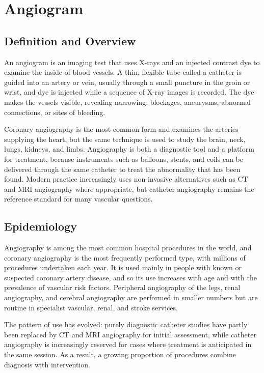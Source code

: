 \chapter{Angiogram}

\section*{Definition and Overview}
An angiogram is an imaging test that uses X-rays and an injected contrast dye to examine the inside of blood vessels. A thin, flexible tube called a catheter is guided into an artery or vein, usually through a small puncture in the groin or wrist, and dye is injected while a sequence of X-ray images is recorded. The dye makes the vessels visible, revealing narrowing, blockages, aneurysms, abnormal connections, or sites of bleeding.

Coronary angiography is the most common form and examines the arteries supplying the heart, but the same technique is used to study the brain, neck, lungs, kidneys, and limbs. Angiography is both a diagnostic tool and a platform for treatment, because instruments such as balloons, stents, and coils can be delivered through the same catheter to treat the abnormality that has been found. Modern practice increasingly uses non-invasive alternatives such as CT and MRI angiography where appropriate, but catheter angiography remains the reference standard for many vascular questions.

\section*{Epidemiology}
Angiography is among the most common hospital procedures in the world, and coronary angiography is the most frequently performed type, with millions of procedures undertaken each year. It is used mainly in people with known or suspected coronary artery disease, and so its use increases with age and with the prevalence of vascular risk factors. Peripheral angiography of the legs, renal angiography, and cerebral angiography are performed in smaller numbers but are routine in specialist vascular, renal, and stroke services.

The pattern of use has evolved: purely diagnostic catheter studies have partly been replaced by CT and MRI angiography for initial assessment, while catheter angiography is increasingly reserved for cases where treatment is anticipated in the same session. As a result, a growing proportion of procedures combine diagnosis with intervention.

